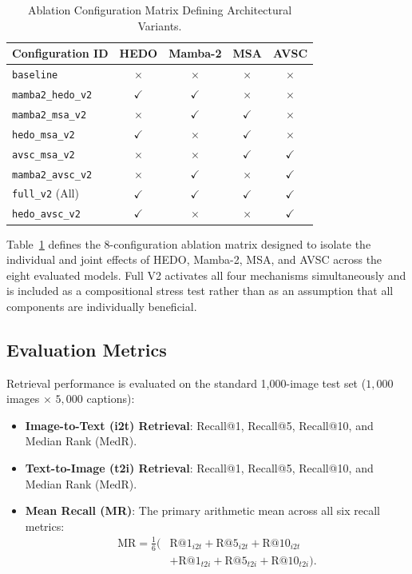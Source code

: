 \documentclass[10pt,journal,final]{IEEEtran}
\begin{document}
\begin{table}[htbp]
\centering
\caption{Ablation Configuration Matrix Defining Architectural Variants.}
\label{tab:configurations}
\begin{tabular}{lcccc}
\toprule
\textbf{Configuration ID} & \textbf{HEDO} & \textbf{Mamba-2} & \textbf{MSA} & \textbf{AVSC} \\
\midrule
\texttt{baseline} & $\times$ & $\times$ & $\times$ & $\times$ \\
\texttt{mamba2\_hedo\_v2} & $\checkmark$ & $\checkmark$ & $\times$ & $\times$ \\
\texttt{mamba2\_msa\_v2} & $\times$ & $\checkmark$ & $\checkmark$ & $\times$ \\
\texttt{hedo\_msa\_v2} & $\checkmark$ & $\times$ & $\checkmark$ & $\times$ \\
\texttt{avsc\_msa\_v2} & $\times$ & $\times$ & $\checkmark$ & $\checkmark$ \\
\texttt{mamba2\_avsc\_v2} & $\times$ & $\checkmark$ & $\times$ & $\checkmark$ \\
\texttt{full\_v2} (All) & $\checkmark$ & $\checkmark$ & $\checkmark$ & $\checkmark$ \\
\texttt{hedo\_avsc\_v2} & $\checkmark$ & $\times$ & $\times$ & $\checkmark$ \\
\bottomrule
\end{tabular}
\end{table}

Table~\ref{tab:configurations} defines the 8-configuration ablation matrix designed to isolate the individual and joint effects of HEDO, Mamba-2, MSA, and AVSC across the eight evaluated models. Full V2 activates all four mechanisms simultaneously and is included as a compositional stress test rather than as an assumption that all components are individually beneficial.

\subsection{Evaluation Metrics}
Retrieval performance is evaluated on the standard 1,000-image test set ($1,000$ images $\times$ $5,000$ captions):
\begin{itemize}
    \item \textbf{Image-to-Text (i2t) Retrieval}: Recall@1, Recall@5, Recall@10, and Median Rank (MedR).
    \item \textbf{Text-to-Image (t2i) Retrieval}: Recall@1, Recall@5, Recall@10, and Median Rank (MedR).
    \item \textbf{Mean Recall (MR)}: The primary arithmetic mean across all six recall metrics:
    \begin{equation}
    \label{eq:mean_recall}
    \begin{aligned}
    \mathrm{MR} = \frac{1}{6} \Big( &\mathrm{R@1}_{i2t} + \mathrm{R@5}_{i2t} + \mathrm{R@10}_{i2t} \\
    &+ \mathrm{R@1}_{t2i} + \mathrm{R@5}_{t2i} + \mathrm{R@10}_{t2i} \Big).
    \end{aligned}
    \end{equation}
\end{itemize}
\end{document}
